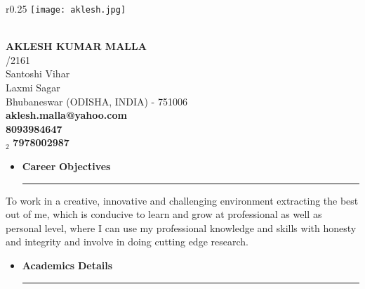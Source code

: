 \documentclass[a4paper]{article}
\newlength{\hdrheight}
\begin{document}


\begin{wrapfigure}{r}{0.25\textwidth} %
    \centering
    \texttt{[image: aklesh.jpg]}
\end{wrapfigure}
\hspace{0.5cm}\\[-0.2cm]

\textbf{AKLESH KUMAR MALLA} \\
/2161 \\
\indent Santoshi Vihar  \\
\indent Laxmi Sagar\\
\indent Bhubaneswar (ODISHA, INDIA) - 751006\\
\indent \faEnvelope \hspace{5pt}\textbf{aklesh.malla@yahoo.com} \\
\indent \faMobile \hspace{5pt}\textbf{8093984647} \\
\indent \faMobilePhone$_2$ \hspace{5pt}\textbf{7978002987} \\

\renewcommand{\labelitemi}{\texttt{[image: jnj.JPG]}}
\begin{itemize}
  \vspace{4ex}
  \item \textbf{\huge{C}}\textbf{\large areer} \textbf{\huge{O}}\textbf{\large bjectives}
  {\color{mypink1}
  \rule{\linewidth}{0.5mm}}
 \end{itemize}
 \justify
To work in a creative, innovative and challenging environment extracting the best out of me, which is conducive to learn and grow at professional as well as personal level, where I can use my professional knowledge and skills with honesty and integrity and involve in doing cutting edge research. 
 
\renewcommand{\labelitemi}{\texttt{[image: jnj.JPG]}}
\begin{itemize}
  \vspace{4ex}
  \item \textbf{\huge{A}}\textbf{\large cademics} \textbf{\huge{D}}\textbf{\large etails}
  {\color{mypink1}
  \rule{\linewidth}{0.5mm}}
 \end{itemize}
 
\end{document}
